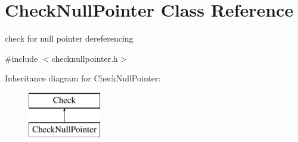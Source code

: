 \hypertarget{class_check_null_pointer}{\section{Check\-Null\-Pointer Class Reference}
\label{class_check_null_pointer}
}


check for null pointer dereferencing  




{\ttfamily \#include $<$checknullpointer.\-h$>$}

Inheritance diagram for Check\-Null\-Pointer\-:\begin{figure}[H]
\begin{center}
\leavevmode
\includegraphics[height=2.000000cm]{class_check_null_pointer}
\end{center}
\end{figure}
